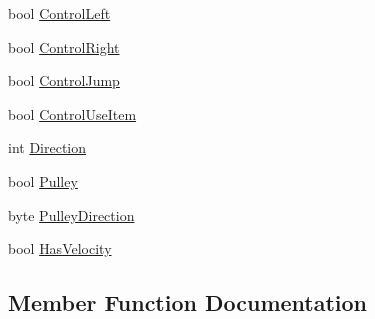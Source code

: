 \begin{DoxyCompactItemize}
\item 
bool \hyperlink{struct_o_t_a_1_1_plugin_1_1_hook_args_1_1_state_update_received_af2407a4436480b0a9afb784ded1899b6}{Control\+Left}
\item 
bool \hyperlink{struct_o_t_a_1_1_plugin_1_1_hook_args_1_1_state_update_received_aba286dc9d721286fac2ff2cbe4eaf3e2}{Control\+Right}
\item 
bool \hyperlink{struct_o_t_a_1_1_plugin_1_1_hook_args_1_1_state_update_received_a439fc2285bce593c9751a23e1fd8c93a}{Control\+Jump}
\item 
bool \hyperlink{struct_o_t_a_1_1_plugin_1_1_hook_args_1_1_state_update_received_a60f42a08174a7771d9aa31d10d4b5497}{Control\+Use\+Item}
\item 
int \hyperlink{struct_o_t_a_1_1_plugin_1_1_hook_args_1_1_state_update_received_a9ea5fd9caf5f84f36ebe85ce0e5dc089}{Direction}
\item 
bool \hyperlink{struct_o_t_a_1_1_plugin_1_1_hook_args_1_1_state_update_received_a2612722e0712e732a6620d2954aca73e}{Pulley}
\item 
byte \hyperlink{struct_o_t_a_1_1_plugin_1_1_hook_args_1_1_state_update_received_a9a3665e43759c419ac15aafe419b077c}{Pulley\+Direction}
\item 
bool \hyperlink{struct_o_t_a_1_1_plugin_1_1_hook_args_1_1_state_update_received_a0a242d295e87f5931322bb057c76d011}{Has\+Velocity}
\end{DoxyCompactItemize}


\subsection{Member Function Documentation}
\hypertarget{struct_o_t_a_1_1_plugin_1_1_hook_args_1_1_state_update_received_ae1f4626be035c8c5f209b2ec7ee64672}{}
